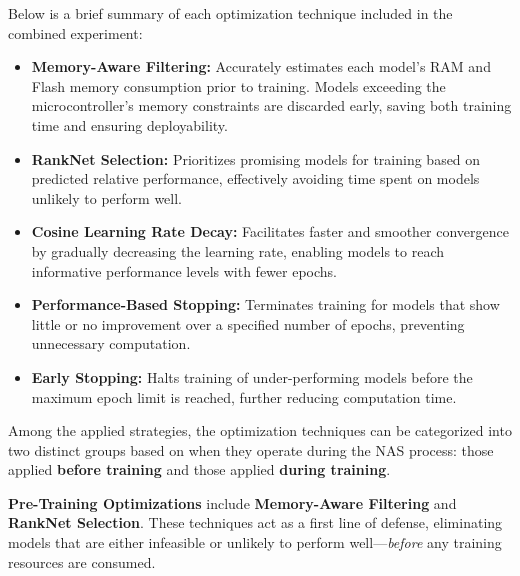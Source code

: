 Below is a brief summary of each optimization technique included in the combined experiment:

\begin{itemize}

    \item \textbf{Memory-Aware Filtering:} Accurately estimates each model’s RAM and Flash memory consumption prior to training. Models exceeding the microcontroller's memory constraints are discarded early, saving both training time and ensuring deployability.

    \item \textbf{RankNet Selection:} Prioritizes promising models for training based on predicted relative performance, effectively avoiding time spent on models unlikely to perform well.

    \item \textbf{Cosine Learning Rate Decay:} Facilitates faster and smoother convergence by gradually decreasing the learning rate, enabling models to reach informative performance levels with fewer epochs.

    \item \textbf{Performance-Based Stopping:} Terminates training for models that show little or no improvement over a specified number of epochs, preventing unnecessary computation.

    \item \textbf{Early Stopping:} Halts training of under-performing models before the maximum epoch limit is reached, further reducing computation time.

\end{itemize}



Among the applied strategies, the optimization techniques can be categorized into two distinct groups based on when they operate during the NAS process: those applied \textbf{before training} and those applied \textbf{during training}.

\textbf{Pre-Training Optimizations} include \textbf{Memory-Aware Filtering} and \textbf{RankNet Selection}. These techniques act as a first line of defense, eliminating models that are either infeasible or unlikely to perform well—\emph{before} any training resources are consumed.


